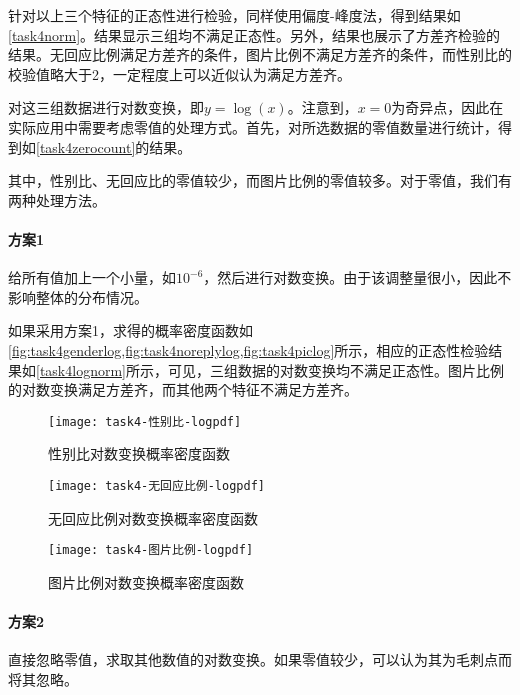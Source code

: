 \documentclass[a4paper,12pt]{article}
\begin{document}
    针对以上三个特征的正态性进行检验，同样使用偏度-峰度法，得到结果如\cref{task4norm}。结果显示三组均不满足正态性。另外，结果也展示了方差齐检验的结果。无回应比例满足方差齐的条件，图片比例不满足方差齐的条件，而性别比的校验值略大于2，一定程度上可以近似认为满足方差齐。
    

    对这三组数据进行对数变换，即$y=\log(x)$。注意到，$x=0$为奇异点，因此在实际应用中需要考虑零值的处理方式。首先，对所选数据的零值数量进行统计，得到如\cref{task4zerocount}的结果。
    
    其中，性别比、无回应比的零值较少，而图片比例的零值较多。对于零值，我们有两种处理方法。
    \paragraph{方案1} 给所有值加上一个小量，如$10^{-6}$，然后进行对数变换。由于该调整量很小，因此不影响整体的分布情况。

    如果采用方案1，求得的概率密度函数如\cref{fig:task4genderlog,fig:task4noreplylog,fig:task4piclog}所示，相应的正态性检验结果如\cref{task4lognorm}所示，可见，三组数据的对数变换均不满足正态性。图片比例的对数变换满足方差齐，而其他两个特征不满足方差齐。
    \begin{figure}
      \texttt{[image: task4-性别比-logpdf]}
      \caption{性别比对数变换概率密度函数}
      \label{fig:task4genderlog}
    \end{figure}
    \begin{figure}
      \texttt{[image: task4-无回应比例-logpdf]}
      \caption{无回应比例对数变换概率密度函数}
      \label{fig:task4noreplylog}
    \end{figure}
    \begin{figure}
      \texttt{[image: task4-图片比例-logpdf]}
      \caption{图片比例对数变换概率密度函数}
      \label{fig:task4piclog}
    \end{figure}
    
    \paragraph{方案2} 直接忽略零值，求取其他数值的对数变换。如果零值较少，可以认为其为毛刺点而将其忽略。
\end{document}
